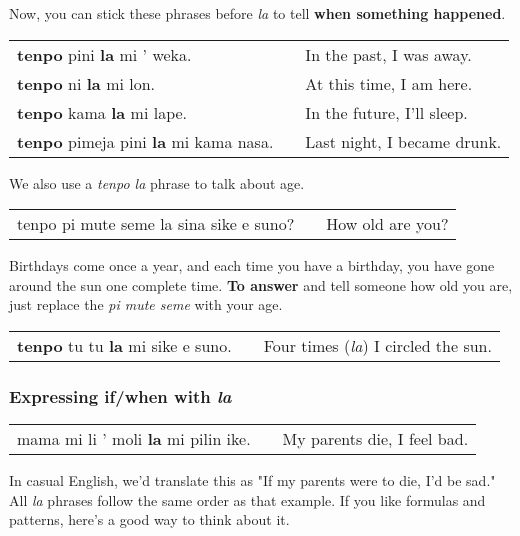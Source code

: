 Now, you can stick these phrases before \textit{la} to tell \textbf{when something happened}. 

\begin{supertabular}{p{5,5cm}|ll}
\textbf{tenpo} pini \textbf{la} mi ' weka. && In the past, I was away. \\
\textbf{tenpo} ni \textbf{la} mi lon. && At this time, I am here. \\
\textbf{tenpo} kama \textbf{la} mi lape. && In the future, I'll sleep. \\
\textbf{tenpo} pimeja pini \textbf{la} mi kama nasa. && Last night, I became drunk. \\
\end{supertabular} 

We also use a \textit{tenpo la} phrase to talk about age. 

\begin{supertabular}{p{5,5cm}|ll}
tenpo pi mute seme la sina sike e suno? && How old are you? \\
\end{supertabular} 

Birthdays come once a year, and each time you have a birthday, you have gone around the sun one complete time. 
\textbf{To answer} and tell someone how old you are, just replace the \textit{pi mute seme} with your age.

\begin{supertabular}{p{5,5cm}|ll}
\textbf{tenpo} tu tu \textbf{la} mi sike e suno. && Four times (\textit{la}) I circled the sun. \\
\end{supertabular} 
%
\subsubsection*{Expressing if/when with \textit{la}}
%
\begin{supertabular}{p{5,5cm}|ll}
mama mi li ' moli \textbf{la} mi pilin ike. && My parents die, I feel bad. \\
\end{supertabular} 

In casual English, we'd translate this as "If my parents were to die, I'd be sad." 
All \textit{la} phrases follow the same order as that example. 
If you like formulas and patterns, here's a good way to think about it. 

